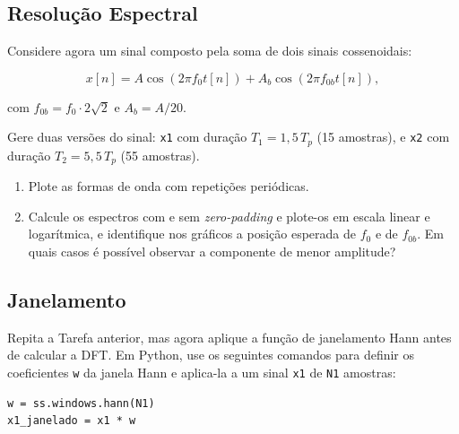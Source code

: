 \documentclass[a4paper,twoside,12pt]{article}
\begin{document}
	
	\subsection{Resolução Espectral}
	
	Considere agora um sinal composto pela soma de dois sinais cossenoidais:
	
	\begin{equation}
		x[n] = A\cos(2\pi f_0 t[n]) + A_b \cos(2\pi f_{0b} t[n]),
		\label{eq:dois_cossenos}
	\end{equation}
	
	\noindent com $f_{0b} = f_0 \cdot 2\sqrt{2}$ e $A_b = A/20$.
	
	Gere duas versões do sinal: \texttt{x1} com duração $T_1 = 1{,}5\,T_p$ (15 amostras), e \texttt{x2} com duração $T_2 = 5{,}5\,T_p$ (55 amostras).
	
	\begin{enumerate}
		\item Plote as formas de onda com repetições periódicas. 
		
		\item Calcule os espectros com e sem \textit{zero-padding} e plote-os em escala linear e logarítmica, e identifique nos gráficos a posição esperada de $f_0$ e de $f_{0b}$. Em quais casos é possível observar a componente de menor amplitude?
		
	\end{enumerate}
	

	\subsection{Janelamento}
	
	Repita a Tarefa anterior, mas agora aplique a função de janelamento Hann antes de calcular a DFT. Em Python, use os seguintes comandos para definir os coeficientes \texttt{w} da janela Hann e aplica-la a um sinal \texttt{x1} de \texttt{N1} amostras:
	
	\begin{lstlisting}[frame=single, caption={Aplicação da janela de Hanning.}]
w = ss.windows.hann(N1)
x1_janelado = x1 * w
	\end{lstlisting}
	
\end{document}
